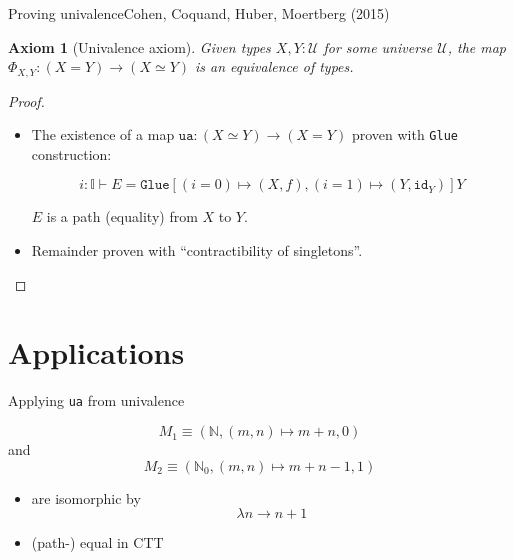 \documentclass[english, draft]{beamer}
\newtheorem{axiom}[theorem]{Axiom}
\begin{document}
\begin{frame}{Proving univalence}{Cohen, Coquand, Huber, Moertberg (2015)}

\begin{axiom}[Univalence axiom]
 Given types $X,Y : \mathcal{U}$ for some universe $\mathcal{U}$, the map $\Phi_{X,Y}: (X=Y) \rightarrow (X \simeq Y)$ is an equivalence of types. 
\end{axiom}


 

\begin{proof}

\begin{itemize}

\item The existence of a map $\texttt{ua} : (X\simeq Y) \rightarrow (X = Y)$ proven with \texttt{Glue} construction:
 
 
 $$i : \mathbb{I} \vdash E= \texttt{Glue} \left[ (i=0) \mapsto (X, f),(i=1) \mapsto\left(Y, \texttt{id}_{Y}\right) \right] Y$$
 
 $E$ is a path (equality) from $X$ to $Y$.
 
 \item Remainder proven with ``contractibility of singletons''.
 
 \end{itemize}
\end{proof} 

\end{frame}


\section{Applications}


\begin{frame}{Applying \texttt{ua} from univalence }
 

 \begin{example}[Monoids]
 
 $$M_1  \equiv (\mathbb{N}, (m,n)\mapsto m+n, 0)$$ and $$M_2 \equiv (\mathbb{N}_0, (m,n)\mapsto m+n -1, 1)$$
\begin{itemize}
 \item  are isomorphic by $$\lambda n \rightarrow n + 1 $$ 
 \item (path-) equal in CTT
\end{itemize}
 
 \end{example}
 

 
\end{frame}
\end{document}
